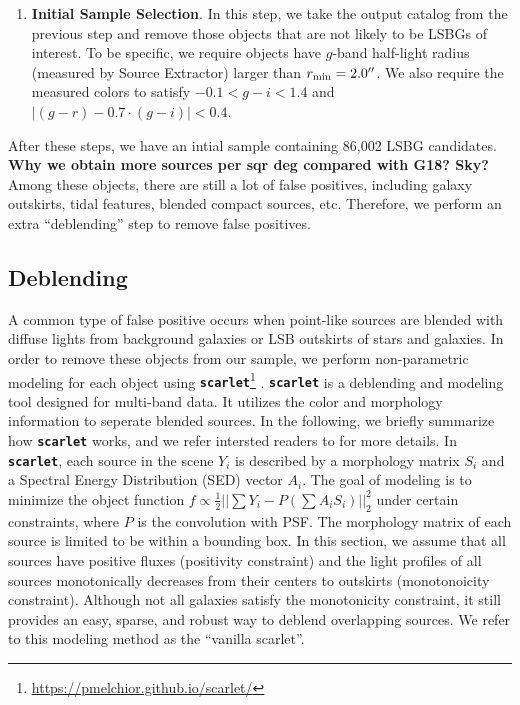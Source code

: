 \documentclass[twocolumn,astrosymb,twocolappendix]{aastex631}
\newcommand{\code}[1]{\textbf{\texttt{#1}}}
\begin{document}
\begin{CJK*}{UTF8}{gbsn}
\begin{enumerate}
    \item \textbf{Initial Sample Selection}. In this step, we take the output catalog from the previous step and remove those objects that are not likely to be LSBGs of interest. To be specific, we require objects have $g$-band half-light radius (measured by Source Extractor) larger than $r_{\rm min} = 2.0\mbox{$^{\prime\prime}$}$. We also require the measured colors to satisfy $-0.1 < g-i < 1.4$ and $|(g-r) - 0.7\cdot (g-i)| < 0.4$. %
    
    
\end{enumerate}
After these steps, we have an intial sample containing 86,002 LSBG candidates. \textbf{Why we obtain more sources per sqr deg compared with G18? Sky?} Among these objects, there are still a lot of false positives, including galaxy outskirts, tidal features, blended compact sources, etc. Therefore, we perform an extra ``deblending'' step to remove false positives.  


\subsection{Deblending}\label{sec:deblending}
A common type of false positive occurs when point-like sources are blended with diffuse lights from background galaxies or LSB outskirts of  stars and galaxies. In order to remove these objects from our sample, we perform non-parametric modeling for  each object using \code{scarlet}\footnote{\url{https://pmelchior.github.io/scarlet/}} \citep{Melchior2018}. \code{scarlet} is a deblending and modeling tool designed for multi-band data. It utilizes the color and morphology information to seperate blended sources. In the following, we briefly summarize how \code{scarlet} works, and we refer intersted readers to \citet{Melchior2018} for more details. In \code{scarlet}, each source in the scene $Y_i$ is described by a morphology matrix $S_i$ and a Spectral Energy Distribution (SED) vector $A_i$. The goal of modeling is to minimize the object function $f \propto \frac{1}{2}||\sum Y_i - P(\sum A_i S_i)||_2^{2}$ under certain constraints, where $P$ is the convolution with PSF. The morphology matrix of each source is limited to be within a bounding box. In this section, we assume that all sources have positive fluxes (positivity constraint) and the light profiles of all sources monotonically decreases from their centers to outskirts (monotonoicity constraint). Although not all galaxies satisfy the monotonicity constraint, it still provides an easy, sparse, and robust way to deblend overlapping sources. We refer to this modeling method as the ``vanilla scarlet''. 


\end{CJK*}
\end{document}
